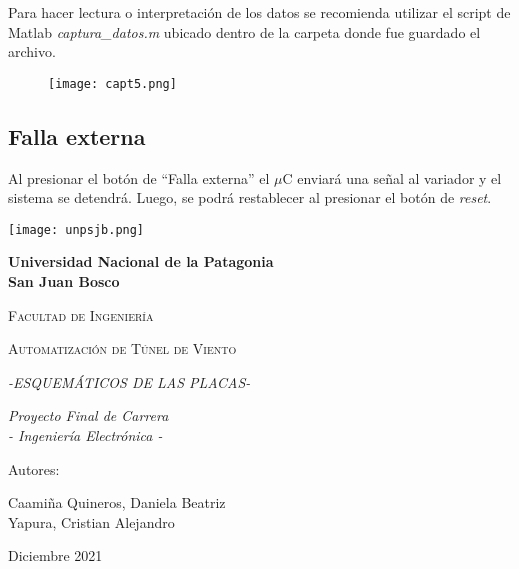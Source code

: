 Para hacer lectura o interpretación de los datos se recomienda utilizar el script de Matlab \textit{captura\_datos.m} ubicado dentro de la carpeta donde fue guardado el archivo.

\begin{figure}[H]
	\centering
	\texttt{[image: capt5.png]}
	\label{fig:capt5}
\end{figure}

\subsection{Falla externa}
	Al presionar el botón de “Falla externa” el $\mu$C enviará una señal al variador y el sistema se detendrá. Luego, se podrá restablecer al presionar el botón de \textit{reset}.

\newpage






\begin{center}
	{\texttt{[image: unpsjb.png]}\par}
	\vspace{1cm}
	{\bfseries\LARGE Universidad Nacional de la Patagonia\\ San Juan Bosco \par}
	\vspace{1cm}
	{\scshape\Large Facultad de Ingenier\'ia \par}
	\vspace{3cm}
	{\scshape\Huge Automatización de Túnel de Viento \par}
	{\itshape\Large -ESQUEMÁTICOS DE LAS PLACAS- \par}
	
	
	\vspace{3cm}
	{\itshape\Large Proyecto Final de Carrera\\ - Ingeniería Electrónica - \par}
	\vfill
	{\Large Autores: \par}
	{\Large Caamiña Quineros, Daniela Beatriz\\ Yapura, Cristian Alejandro \par}
	\vfill
	{\Large Diciembre 2021 \par}
\end{center}





\newpage



